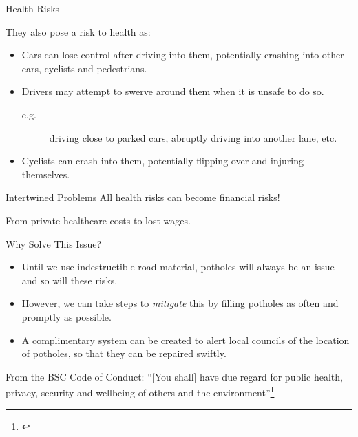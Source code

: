 \documentclass{beamer}
\begin{document}
\begin{frame}{Health Risks}

They also pose a risk to \alert{health} as:

    \begin{itemize}
        \item Cars can lose control after driving into them, potentially crashing into other cars, cyclists and pedestrians.
        \item Drivers may attempt to swerve around them when it is unsafe to do so.
        \begin{description}
            \item[e.g.] driving close to parked cars, abruptly driving into another lane, etc.
        \end{description}
        \item Cyclists can crash into them, potentially flipping-over and injuring themselves.
    \end{itemize}

    \begin{alertblock}{Intertwined Problems}
        All health risks can become financial risks!

        From private healthcare costs to lost wages.
    \end{alertblock}

\end{frame}

\begin{frame}{Why Solve This Issue?}
    \begin{itemize}
        \item Until we use indestructible road material, potholes will always be an issue --- and so will these risks.
        \item However, we can take steps to \emph{mitigate} this by filling potholes as often and promptly as possible.
        \item A complimentary system can be created to alert local councils of the location of potholes, so that they can be repaired swiftly.
    \end{itemize}

    \begin{block}{From the BSC Code of Conduct:}
    ``[You shall] have due regard for public health, privacy, security and wellbeing of others and
    the environment''\footnote[frame]{\cite{bcs-coc}}
    \end{block}
\end{frame}
\end{document}
